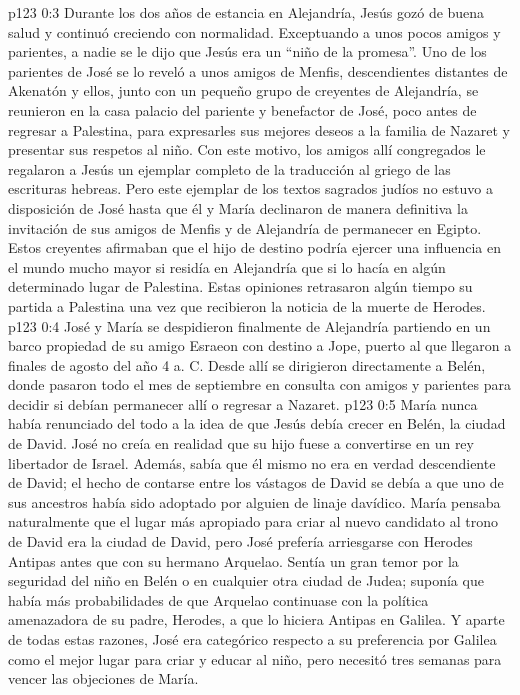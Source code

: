 \vs p123 0:3 Durante los dos años de estancia en Alejandría, Jesús gozó de buena salud y continuó creciendo con normalidad. Exceptuando a unos pocos amigos y parientes, a nadie se le dijo que Jesús era un “niño de la promesa”. Uno de los parientes de José se lo reveló a unos amigos de Menfis, descendientes distantes de Akenatón y ellos, junto con un pequeño grupo de creyentes de Alejandría, se reunieron en la casa palacio del pariente y benefactor de José, poco antes de regresar a Palestina, para expresarles sus mejores deseos a la familia de Nazaret y presentar sus respetos al niño. Con este motivo, los amigos allí congregados le regalaron a Jesús un ejemplar completo de la traducción al griego de las escrituras hebreas. Pero este ejemplar de los textos sagrados judíos no estuvo a disposición de José hasta que él y María declinaron de manera definitiva la invitación de sus amigos de Menfis y de Alejandría de permanecer en Egipto. Estos creyentes afirmaban que el hijo de destino podría ejercer una influencia en el mundo mucho mayor si residía en Alejandría que si lo hacía en algún determinado lugar de Palestina. Estas opiniones retrasaron algún tiempo su partida a Palestina una vez que recibieron la noticia de la muerte de Herodes.
\vs p123 0:4 \pc José y María se despidieron finalmente de Alejandría partiendo en un barco propiedad de su amigo Esraeon con destino a Jope, puerto al que llegaron a finales de agosto del año 4 a. C. Desde allí se dirigieron directamente a Belén, donde pasaron todo el mes de septiembre en consulta con amigos y parientes para decidir si debían permanecer allí o regresar a Nazaret.
\vs p123 0:5 María nunca había renunciado del todo a la idea de que Jesús debía crecer en Belén, la ciudad de David. José no creía en realidad que su hijo fuese a convertirse en un rey libertador de Israel. Además, sabía que él mismo no era en verdad descendiente de David; el hecho de contarse entre los vástagos de David se debía a que uno de sus ancestros había sido adoptado por alguien de linaje davídico. María pensaba naturalmente que el lugar más apropiado para criar al nuevo candidato al trono de David era la ciudad de David, pero José prefería arriesgarse con Herodes Antipas antes que con su hermano Arquelao. Sentía un gran temor por la seguridad del niño en Belén o en cualquier otra ciudad de Judea; suponía que había más probabilidades de que Arquelao continuase con la política amenazadora de su padre, Herodes, a que lo hiciera Antipas en Galilea. Y aparte de todas estas razones, José era categórico respecto a su preferencia por Galilea como el mejor lugar para criar y educar al niño, pero necesitó tres semanas para vencer las objeciones de María.
